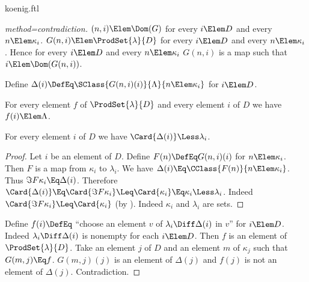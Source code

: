 \documentclass{stex}
\begin{document}
\begin{smodule}{koenig.ftl}
\begin{forthel}
\begin{proof}[method=contradiction]
    $(n,i) \Elem \Dom(G)$ for every $i \Elem D$ and every $n \Elem \kappa_{i}$.
    $G(n,i) \Elem \ProdSet{\lambda}{D}$ for every $i \Elem D$ and every $n \Elem \kappa_{i}$.
    Hence for every $i \Elem D$ and every $n \Elem \kappa_{i}$ $G(n,i)$ is a map such that $i \Elem \Dom(G(n,i))$.

    Define $\Delta(i) \DefEq \SClass{G(n,i)(i)}{\Lambda}{n \Elem \kappa_{i}}$ for $i \Elem D$.

    For every element $f$ of $\ProdSet{\lambda}{D}$ and every element $i$ of $D$ we have $f(i) \Elem \Lambda$.

    For every element $i$ of $D$ we have $\Card{\Delta(i)} \Less \lambda_{i}$.
    \begin{proof}
      Let $i$ be an element of $D$.
      Define $F(n) \DefEq G(n,i)(i)$ for $n \Elem \kappa_{i}$.
      Then $F$ is a map from $\kappa_{i}$ to $\lambda_{i}$.
      We have $\Delta(i) \Eq \CClass{F(n)}{n \Elem \kappa_{i}}$.
      Thus $\Im{F}{\kappa_{i}} \Eq \Delta(i)$.
      Therefore $\Card{\Delta(i)}
        \Eq \Card{\Im{F}{\kappa_{i}}}
        \Leq \Card{\kappa_{i}}
        \Eq \kappa_{i}
        \Less \lambda_{i}$.
      Indeed $\Card{\Im{F}{\kappa_{i}}} \Leq \Card{\kappa_{i}}$ (by ).
      Indeed $\kappa_{i}$ and $\lambda_{i}$ are sets.
    \end{proof}

    Define $f(i) \DefEq$ ``choose an element $v$ of $\lambda_{i} \Diff \Delta(i)$ in $v$'' for $i \Elem D$.
    Indeed $\lambda_{i} \Diff \Delta(i)$ is nonempty for each $i \Elem D$.
    Then $f$ is an element of $\ProdSet{\lambda}{D}$.
    Take an element $j$ of $D$ and an element $m$ of $\kappa_{j}$ such that $G(m,j) \Eq f$.
    $G(m,j)(j)$ is an element of $\Delta(j)$ and $f(j)$ is not an element of $\Delta(j)$.
    Contradiction.
  \end{proof}
\end{forthel}

\printbibliography
{}

\end{smodule}
\end{document}
